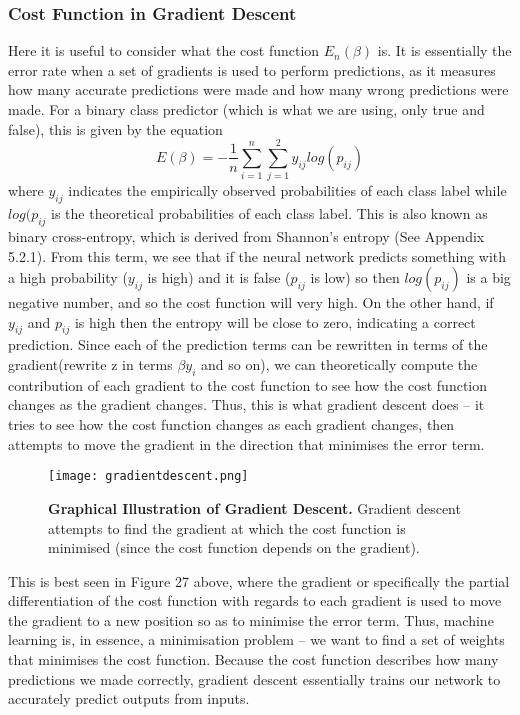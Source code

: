 \documentclass{article}
\begin{document}
\subsubsection{Cost Function in Gradient Descent}
Here it is useful to consider what the cost function ${E_n}(\beta)$ is. It is essentially the error rate when a set of gradients is used to perform predictions, as it measures how many accurate predictions were made and how many wrong predictions were made. For a binary class predictor (which is what we are using, only true and false), this is given by the equation
\begin{equation}
E(\beta) = - \frac{1}{n}\sum_{i=1}^{n}{\sum_{j=1}^{2}y_{ij}log(p_{ij})}
\end{equation} 
where $y_{ij}$ indicates the empirically observed probabilities of each class label while $log(p_{ij}$ is the theoretical probabilities of each class label. This is also known as binary cross-entropy, which is derived from Shannon's entropy (See Appendix 5.2.1). From this term, we see that if the neural network predicts something with a high probability ($y_{ij}$ is high) and it is false ($p_{ij}$ is low) so then $log(p_{ij})$ is a big negative number, and so the cost function will very high. On the other hand, if $y_{ij}$ and $p_{ij}$ is high then the entropy will be close to zero, indicating a correct prediction. Since each of the prediction terms can be rewritten in terms of the gradient(rewrite z in terms $\beta y_i $ and so on), we can theoretically compute the contribution of each gradient to the cost function to see how the cost function changes as the gradient changes. Thus, this is what gradient descent does -- it tries to see how the cost function changes as each gradient changes, then attempts to move the gradient in the direction that minimises the error term.

\begin{figure}[H]
\texttt{[image: gradientdescent.png]}
\caption{\textbf{Graphical Illustration of Gradient Descent.} Gradient descent attempts to find the gradient at which the cost function is minimised (since the cost function depends on the gradient).}
\centering
\end{figure}
 This is best seen in Figure 27 above, where the gradient or specifically the partial differentiation of the cost function with regards to each gradient is used to move the gradient to a new position so as to minimise the error term. Thus, machine learning is, in essence, a minimisation problem -- we want to find a set of weights that minimises the cost function. Because the cost function describes how many predictions we made correctly, gradient descent essentially trains our network to accurately predict outputs from inputs.
\end{document}
